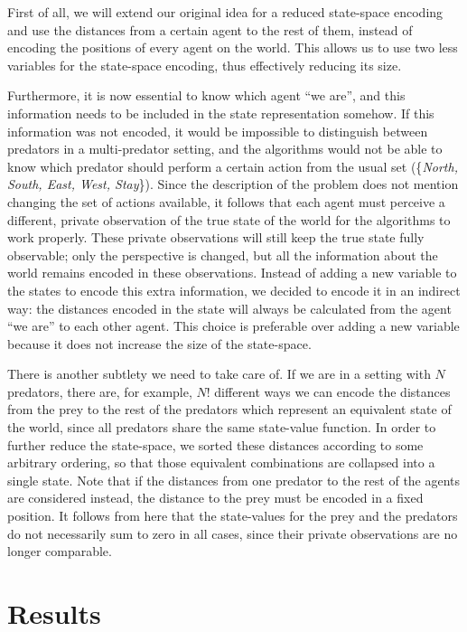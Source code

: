 \documentclass[a4paper,12pt]{article}
\begin{document}
First of all, we will extend our original idea for a reduced state-space encoding and use the distances from a certain agent to the rest of them, instead of encoding the positions of every agent on the world. This allows us to use two less variables for the state-space encoding, thus effectively reducing its size. 

Furthermore, it is now essential to know which agent ``we are'', and this information needs to be included in the state representation somehow. If this information was not encoded, it would be impossible to distinguish between predators in a multi-predator setting, and the algorithms would not be able to know which predator should perform a certain action from the usual set (\{\textit{North, South, East, West, Stay}\}). Since the description of the problem does not mention changing the set of actions available, it follows that each agent must perceive a different, private observation of the true state of the world for the algorithms to work properly. These private observations will still keep the true state fully observable; only the perspective is changed, but all the information about the world remains encoded in these observations. Instead of adding a new variable to the states to encode this extra information, we decided to encode it in an indirect way: the distances encoded in the state will always be calculated from the agent ``we are'' to each other agent. This choice is preferable over adding a new variable because it does not increase the size of the state-space.

There is another subtlety we need to take care of. If we are in a setting with $N$ predators, there are, for example, $N!$ different ways we can encode the distances from the prey to the rest of the predators which represent an equivalent state of the world, since all predators share the same state-value function. In order to further reduce the state-space, we sorted these distances according to some arbitrary ordering, so that those equivalent combinations are collapsed into a single state. Note that if the distances from one predator to the rest of the agents are considered instead, the distance to the prey must be encoded in a fixed position. It follows from here that the state-values for the prey and the predators do not necessarily sum to zero in all cases, since their private observations are no longer comparable.

\newpage

\section{Results}
\end{document}
